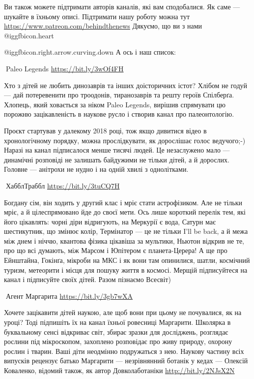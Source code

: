 Ви також можете підтримати авторів каналів, які вам сподобалися. Як саме —
шукайте в їхньому описі. Підтримати нашу роботу можна тут
 \url{https://www.patreon.com/behindthenews} Дякуємо, що ви з нами @igg{fbicon.heart}🖤

@igg{fbicon.right.arrow.curving.down} А ось і наш список:

🦉Paleo Legends \url{https://bit.ly/3wOf4FH}

Хто з дітей не любить динозаврів та інших доісторичних істот? Хлібом не годуй — дай потеревенити про троодонів, тиранозаврів та решту героїв Спілберґа. Хлопець, який ховається за ніком Paleo Legends, вирішив спрямувати цю порожню зацікавленість в наукове русло і створив канал про палеонтологію.

Проєкт стартував у далекому 2018 році, тож якщо дивитися відео в хронологічному порядку, можна прослідкувати, як дорослішає голос ведучого;-) Наразі на канал підписалося менше тисячі людей. Це незаслужено мало — динамічні розповіді не залишать байдужими не тільки дітей, а й дорослих. Головне — анітрохи не нудно і на одній хвилі з однолітками.

🦉ХабблТраббл \url{https://bit.ly/3tuCQ7H}

Богдану сім, він ходить у другий клас і мріє стати астрофізиком. Але не тільки
мріє, а й цілеспрямовано йде до своєї мети. Ось лише короткий перелік тем, які
його цікавлять: чорні діри відригують, на Меркурії є вода, Сатурн має
шестикутник, що змінює колір, Термінатор — це не тільки I'll be back, а й межа
між днем і ніччю, квантова фізика цікавіша за мультики, Ньютон відкрив не те,
про що всі думають, між Марсом і Юпітером є планета-Церера! А ще про Ейнштайна,
Гокінґа, мікроби на МКС і як вони там опинилися, шатли, космічний туризм,
метеорити і місця для пошуку життя в космосі. Мерщій підписуйтеся на канал і
підписуйте своїх дітей. Разом пізнаємо Всесвіт)

🦉Агент Маргарита \url{https://bit.ly/3gb7wXA}

Хочете зацікавити дітей наукою, але щоб вони при цьому не почувалися, як на уроці? Тоді підпишіть їх на канал їхньої ровесниці Маргарити. Школярка в буквальному сенсі відкриває світ, збирає зразки для досліджень, розглядає рослини під мікроскопом, захоплено розповідає про живу природу, охорону рослин і тварин. Ваші діти неодмінно подружаться з нею. Наукову частину всіх випусків рецензує батько Маргарити — незрівнянний ботанік у кедах — Олексій Коваленко, відомий також, як автор Довколаботаніки \url{http://bit.ly/2NJsX2N}

